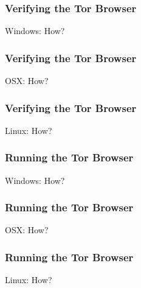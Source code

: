 \documentclass{beamer}
\begin{document}
\begin{frame}
\frametitle{Verifying the Tor Browser}
        \begin{block}{Windows: How?}
	\end{block}
\end{frame}

\begin{frame}
\frametitle{Verifying the Tor Browser}
        \begin{block}{OSX: How?}
        \end{block}
\end{frame}

\begin{frame}
\frametitle{Verifying the Tor Browser}
        \begin{block}{Linux: How?}
        \end{block}
\end{frame}

\begin{frame}
\frametitle{Running the Tor Browser}
        \begin{block}{Windows: How?}
        \end{block}
\end{frame}

\begin{frame}
\frametitle{Running the Tor Browser}
        \begin{block}{OSX: How?}
        \end{block}
\end{frame}

\begin{frame}
\frametitle{Running the Tor Browser}
        \begin{block}{Linux: How?}
        \end{block}
\end{frame}
\end{document}
